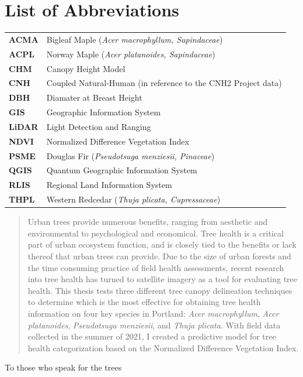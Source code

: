 \documentclass[12pt,twoside]{reedthesis}
\begin{document}
\chapter*{List of Abbreviations}
\begin{table}[h]
    \centering
    \begin{tabular}{ll}
                \textbf{ACMA} & Bigleaf Maple (\textit{Acer macrophyllum, Sapindaceae}) \\
                \textbf{ACPL} & Norway Maple (\textit{Acer platanoides, Sapindaceae}) \\
                \textbf{CHM} & Canopy Height Model \\
                \textbf{CNH} & Coupled Natural-Human (in reference to the CNH2 Project data) \\
                \textbf{DBH} & Diamater at Breast Height \\
                \textbf{GIS} & Geographic Information System \\
                \textbf{LiDAR} & Light Detection and Ranging \\
                \textbf{NDVI} & Normalized Difference Vegetation Index \\
                \textbf{PSME} & Douglas Fir (\textit{Pseudotsuga menziesii, Pinaceae}) \\
                \textbf{QGIS} & Quantum Geographic Information System \\
                \textbf{RLIS} & Regional Land Information System \\
                \textbf{THPL} & Western Redcedar (\textit{Thuja plicata, Cupressaceae}) \\
            \end{tabular}
\end{table}
  \hypersetup{linkcolor=black}
  \setcounter{secnumdepth}{2}
  \setcounter{tocdepth}{2}
  \tableofcontents

  \listoftables

  \listoffigures
  \begin{abstract}
    Urban trees provide numerous benefits, ranging from aesthetic and environmental to psychological and economical. Tree health is a critical part of urban ecosystem function, and is closely tied to the benefits or lack thereof that urban trees can provide. Due to the size of urban forests and the time consuming practice of field health assessments, recent research into tree health has turned to satellite imagery as a tool for evaluating tree health. This thesis tests three different tree canopy delineation techniques to determine which is the most effective for obtaining tree health information on four key species in Portland: \emph{Acer macrophyllum}, \emph{Acer platanoides}, \emph{Pseudotsuga menziesii}, and \emph{Thuja plicata}. With field data collected in the summer of 2021, I created a predictive model for tree health categorization based on the Normalized Difference Vegetation Index.
  \end{abstract}
  \begin{dedication}
    To those who speak for the trees
  \end{dedication}
\mainmatter %
\pagestyle{fancyplain} %
\end{document}
